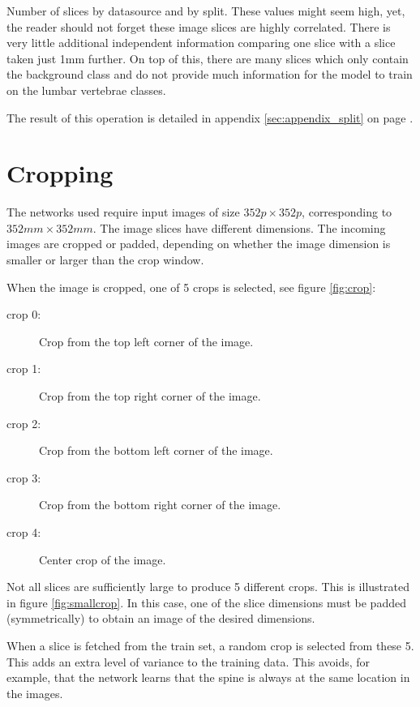  \begin{table}
 
    
    \caption{Number of slices by datasource and by split.
    These values might seem high, yet, the reader should not forget these image slices are highly correlated. 
    There is very little additional independent information comparing one slice with a slice taken just 1mm further.
    On top of this, there are many slices which only contain the background class and do not provide much information for the model to train on the lumbar vertebrae classes. 
    \label{tab:summary_split_slices}}
  
  \end{table}

The result of this operation is detailed in appendix \ref{sec:appendix_split} on page \pageref{sec:appendix_split}.

\section{Cropping\label{sec:cropping}}
The networks used require input images of size $352 p \times 352 p$, corresponding to $352 mm \times 352 mm$.
The image slices have different dimensions.
The incoming images are cropped or padded, depending on whether the image dimension is smaller or larger than the crop window.


When the image is cropped, one of 5 crops is selected, see figure \ref{fig:crop}:
\begin{description}
    \item[crop 0:] Crop from the top left corner of the image.
    \item[crop 1:] Crop from the top right corner of the image.
    \item[crop 2:] Crop from the bottom left corner of the image.
    \item[crop 3:] Crop from the bottom right corner of the image.
    \item[crop 4:] Center crop of the image.  
\end{description}

Not all slices are sufficiently large to produce 5 different crops. This is illustrated in figure \ref{fig:smallcrop}. In this case, one of the slice dimensions must be padded (symmetrically) to obtain an image of the desired dimensions.

When a slice is fetched from the train set, a random crop is selected from these 5.
This adds an extra level of variance to the training data. This avoids, for example, that the network learns that the spine is always at the same location in the images.

